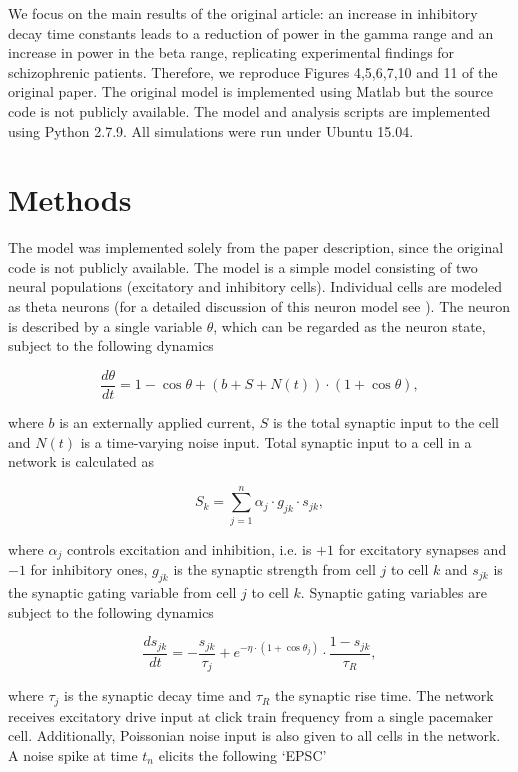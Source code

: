 \documentclass[10pt,a4paper,onecolumn]{article}
\begin{document}
We focus on the main results of the original article: an increase in
inhibitory decay time constants leads to a reduction of power in the
gamma range and an increase in power in the beta range, replicating
experimental findings for schizophrenic patients. Therefore, we
reproduce Figures 4,5,6,7,10 and 11 of the original paper. The original
model is implemented using Matlab but the source code is not publicly
available. The model and analysis scripts are implemented using Python
2.7.9. All simulations were run under Ubuntu 15.04.

\section{Methods}\label{methods}

The model was implemented solely from the paper description, since the
original code is not publicly available. The model is a simple model
consisting of two neural populations (excitatory and inhibitory cells).
Individual cells are modeled as theta neurons (for a detailed discussion
of this neuron model see \autocite{Boergers2003}). The neuron is
described by a single variable \(\theta\), which can be regarded as the
neuron state, subject to the following dynamics

\[\frac{d \theta}{dt}=1-\cos \theta + (b+S+N(t))\cdot(1+ \cos \theta),\]

where \(b\) is an externally applied current, \(S\) is the total
synaptic input to the cell and \(N(t)\) is a time-varying noise input.
Total synaptic input to a cell in a network is calculated as

\[S_k = \sum_{j=1}^n \alpha_j \cdot g_{jk} \cdot s_{jk},\]

where \(\alpha _j\) controls excitation and inhibition, i.e. is $+1$ for excitatory synapses and $-1$ for inhibitory ones,
\(g_{jk}\)
is the synaptic strength from cell \(j\) to cell \(k\) and \(s_{jk}\) is
the synaptic gating variable from cell \(j\) to cell \(k\). Synaptic
gating variables are subject to the following dynamics

\[\frac{ds_{jk}}{dt}= - \frac{s _{jk}}{\tau _j} + e ^{- \eta \cdot (1+ \cos \theta _j)} \cdot \frac{1-s _{jk}}{\tau _R},\]

where \(\tau _j\) is the synaptic decay time and \(\tau_R\) the synaptic
rise time. The network receives excitatory drive input at click train
frequency from a single pacemaker cell. Additionally, Poissonian noise
input is also given to all cells in the network. A noise spike at time
\(t_n\) elicits the following `EPSC'
\end{document}
